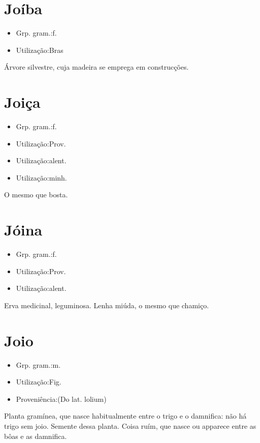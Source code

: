 \documentclass{article}
\begin{document}
\section{Joíba}
\begin{itemize}
\item {Grp. gram.:f.}
\end{itemize}
\begin{itemize}
\item {Utilização:Bras}
\end{itemize}
Árvore silvestre, cuja madeira se emprega em construcções.
\section{Joiça}
\begin{itemize}
\item {Grp. gram.:f.}
\end{itemize}
\begin{itemize}
\item {Utilização:Prov.}
\end{itemize}
\begin{itemize}
\item {Utilização:alent.}
\end{itemize}
\begin{itemize}
\item {Utilização:minh.}
\end{itemize}
O mesmo que \textunderscore bosta\textunderscore .
\section{Jóina}
\begin{itemize}
\item {Grp. gram.:f.}
\end{itemize}
\begin{itemize}
\item {Utilização:Prov.}
\end{itemize}
\begin{itemize}
\item {Utilização:alent.}
\end{itemize}
Erva medicinal, leguminosa.
Lenha miúda, o mesmo que \textunderscore chamiço\textunderscore .
\section{Joio}
\begin{itemize}
\item {Grp. gram.:m.}
\end{itemize}
\begin{itemize}
\item {Utilização:Fig.}
\end{itemize}
\begin{itemize}
\item {Proveniência:(Do lat. \textunderscore lolium\textunderscore )}
\end{itemize}
Planta gramínea, que nasce habitualmente entre o trigo e o damnifica: \textunderscore não há trigo sem joio\textunderscore .
Semente dessa planta.
Coisa ruím, que nasce ou apparece entre as bôas e as damnifica.
\end{document}
